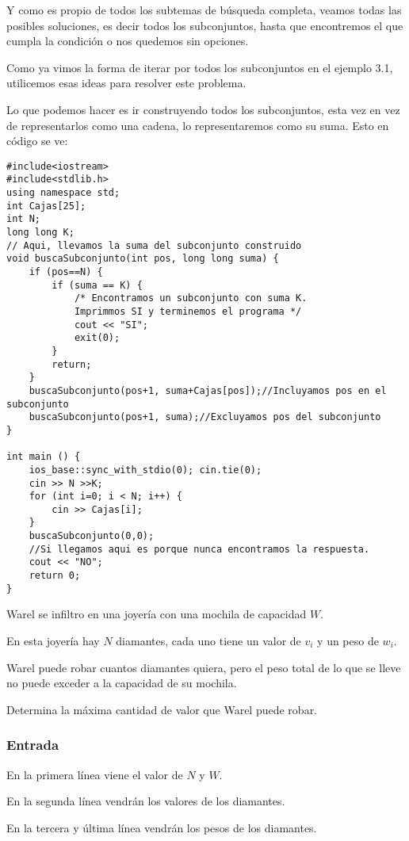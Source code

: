 Y como es propio de todos los subtemas de búsqueda completa, veamos todas las posibles soluciones, es decir todos los subconjuntos, hasta que encontremos el que cumpla la condición o nos quedemos sin opciones.

Como ya vimos la forma de iterar por todos los subconjuntos en el ejemplo 3.1, utilicemos esas ideas para resolver este problema.

Lo que podemos hacer es ir construyendo todos los subconjuntos, esta vez en vez de representarlos como una cadena, lo representaremos como su suma. Esto en código se ve:
\newpage
\begin{lstlisting}
#include<iostream>
#include<stdlib.h>
using namespace std;
int Cajas[25];
int N;
long long K;
// Aqui, llevamos la suma del subconjunto construido
void buscaSubconjunto(int pos, long long suma) {
	if (pos==N) {
		if (suma == K) {
			/* Encontramos un subconjunto con suma K.
			Imprimmos SI y terminemos el programa */
			cout << "SI";
			exit(0);
		}
		return;
	}
	buscaSubconjunto(pos+1, suma+Cajas[pos]);//Incluyamos pos en el subconjunto
	buscaSubconjunto(pos+1, suma);//Excluyamos pos del subconjunto	
}

int main () {
	ios_base::sync_with_stdio(0); cin.tie(0);
	cin >> N >>K;
	for (int i=0; i < N; i++) {
		cin >> Cajas[i];
	}
	buscaSubconjunto(0,0);
	//Si llegamos aqui es porque nunca encontramos la respuesta.
	cout << "NO";
	return 0;
}
\end{lstlisting}

\newpage


\problemtitle Warel se infiltro en una joyería con una mochila de capacidad \(W\).

En esta joyería hay \(N\) diamantes, cada uno tiene un valor de \(v_i\) y un peso de \(w_i\).

Warel puede robar cuantos diamantes quiera, pero el peso total de lo que se lleve no puede exceder a la capacidad de su mochila.

Determina la máxima cantidad de valor que Warel puede robar.

\subsubsection*{Entrada}
En la primera línea viene el valor de \(N\) y \(W\).

En la segunda línea vendrán los valores de los diamantes.

En la tercera y última línea vendrán los pesos de los diamantes.
